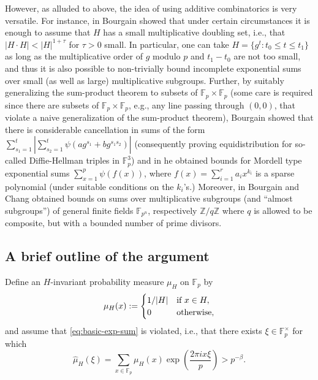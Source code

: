 \documentclass[11pt]{amsart}
\newcommand{\fp}{\mathbb{F}_p}
\newcommand{\muh}{{\mu_H}}
\newcommand{\muhat}{{\widehat{\mu}}}
\newcommand{\Z}{{\mathbb{Z}}}
\begin{document}
However, as alluded to above, the idea of using additive combinatorics
is very versatile.  For instance, in \cite{bou04-diffie,bou05-diffie}
Bourgain showed that under certain circumstances it is enough to
assume that $H$ has a small multiplicative doubling set, i.e., that
$|H \cdot H| < |H|^{1+\tau}$ 
for $\tau>0$ small.  In particular, one can take $H = \{ g^t : t_0
\leq t \leq t_1 \}$ as long as the multiplicative order of $g$ modulo
$p$ and $t_1-t_0$ are not too small, and thus it is also possible to
non-trivially bound incomplete exponential sums over small (as well as
large) multiplicative subgroups.
%
Further, by suitably generalizing the sum-product theorem to subsets
of $\fp \times \fp$ (some care is required since there are subsets of
$\fp \times \fp$, e.g., any line passing through $(0,0)$, that violate
a naive generalization of the sum-product theorem), Bourgain showed
that there is considerable cancellation in sums of the form
$\sum_{s_1=1}^t | \sum_{s_2=1}^t \psi( a g^{s_1} + b g^{s_1 s_2})|$
(consequently proving equidistribution for so-called Diffie-Hellman
triples in $\fp^3$) and in \cite{bou04a,bou05} he obtained bounds for
Mordell type exponential sums $\sum_{x=1}^p \psi(f(x))$, where $f(x) =
\sum_{i=1}^r a_i x^{k_i}$ is a sparse polynomial (under suitable
conditions on the $k_i$'s.)
%
Moreover, in \cite{Bourgain-Chang-gauss-sum,boch06}
Bourgain and Chang obtained bounds on sums over multiplicative
subgroups (and ``almost subgroups'') of general finite fields
$\mathbb{F}_{p^n}$, respectively $\Z/q\Z$ where $q$ is allowed to be
composite, but with a bounded number of prime divisors.



\subsection{A brief outline of the argument}
Define an $H$-invariant probability measure $\muh$ on $\fp$ by
$$
\muh(x) := \begin{cases} 1/|H| & \text{if}\ x\in H,\cr 0 &
\text{otherwise,}
\end{cases}
$$
and assume that \eqref{eq:basic-exp-sum} is violated, i.e., that
there exists $\xi \in \fp^\times$ for which
\begin{equation}\label{eq:large-fourier-coeff}
\muhat_H(\xi) = \sum_{x \in \fp} \muh(x)
 \exp \left(\frac{2 \pi i x \xi}{p} \right)
> p^{-\beta} .
\end{equation}
\end{document}
